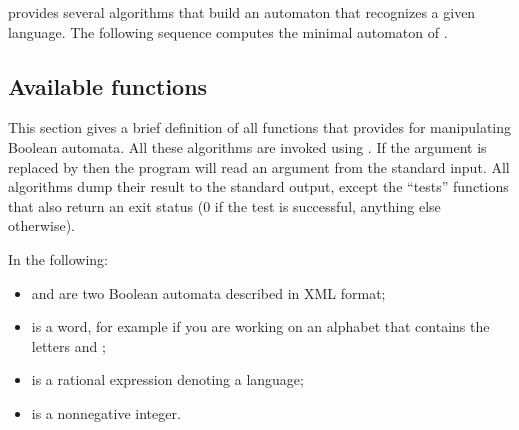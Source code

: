 \Vauc provides several algorithms that build an automaton that
recognizes a given language.  The following sequence computes the
minimal automaton of .

\begin{center}
\end{center}

\subsection{Available functions}
This section gives a brief definition of all functions that \Vauc
provides for manipulating Boolean automata.  All these algorithms are
invoked using . If
the argument is replaced by \samp{-} then the program will read an
argument from the standard input.  All algorithms dump their result to
the standard output, except the ``tests'' functions that also return
an exit status (0 if the test is successful, anything else otherwise).

\smallskip

In the following:
\begin{itemize}
\item {} and  are two Boolean automata described
  in \Vauc XML format;
\item {} is a word, for example  if you are
  working on an alphabet that contains the letters  and
  ;
\item {} is a rational expression denoting a language;
\item {} is a nonnegative integer.
\end{itemize}


\newenvironment{fnsection}[1]{%
  \renewcommand{\item}[3]{\texttt{##1} \var{##2} & ##3\\}

  \tabularx{\textwidth}{|l|X|}%
    \hline\multicolumn{2}{|c|}{#1} \\\hline%
  }{%
  \endtabularx%
}


